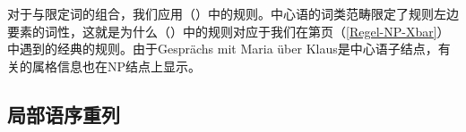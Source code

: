\z
对于\nbarc 与限定词的组合，我们应用（）中的规则。中心语的词类范畴限定了规则左边要素的词性，这就是为什么（）中的规则对应于我们在第\pageref{Regel-NP-Xbar}页（\ref{Regel-NP-Xbar}）中遇到的经典的\xbarc 规则。由于Gesprächs mit Maria über Klaus是中心语子结点，有关\nbarc 的属格信息也在NP结点上显示。

\subsection{局部语序重列}
\label{GPSG-lokale-Umstellung}\label{sec-IDLP-intro}

